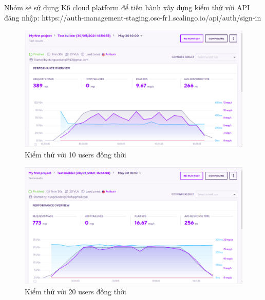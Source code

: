 		    Nhóm sẽ sử dụng K6 cloud platform để tiến hành xây dựng kiểm thử với API đăng nhập:
		    https://auth-management-staging.osc-fr1.scalingo.io/api/auth/sign-in
        
        \begin{figure}[H]
			\includegraphics[width=1\textwidth]{Images/testing/testing_10.png}
			\centering
			\linebreak
			\caption{Kiểm thử với 10 users đồng thời}
		\end{figure}
	
		\begin{figure}[H]
			\includegraphics[width=1\textwidth]{Images/testing/testing_20.png}
			\centering
			\linebreak
			\caption{Kiểm thử với 20 users đồng thời}
		\end{figure}
		
